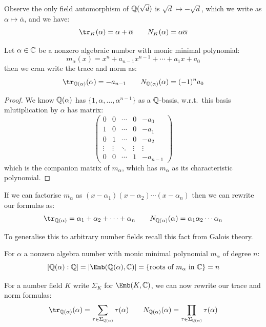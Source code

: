 \documentclass{article}
\begin{document}
Observe the only field automorphism of $\mathbb{Q}(\sqrt{d})$ is $\sqrt{d}\mapsto-\sqrt{d}$, which we write as $\alpha\mapsto\overline{\alpha}$, and we have: \[
    \tr_K(\alpha) = \alpha+\overline{\alpha} \qquad N_K(\alpha) = \alpha\overline{\alpha}
\]

\begin{proposition}
    Let $\alpha\in \mathbb{C}$ be a nonzero algebraic number with monic minimal polynomial: \[
    m_\alpha(x) = x^n + a_{n-1}x^{n-1} + \cdots + a_1x +a_0
    \] then we cran write the trace and norm as: \[
    \tr_{\bQ(\alpha)}(\alpha) = -a_{n-1} \qquad N_{\bQ(\alpha)}(\alpha) = (-1)^na_0
    \]\begin{proof}
        We know $\mathbb{Q}(\alpha)$ has $\{1,\alpha,\ldots,\alpha^{n-1}\}$ as a $\mathbb{Q}$-basis, w.r.t.~this basis mlutiplication by $\alpha$ has matrix: \[
        \begin{pmatrix}
            0 & 0 & \cdots & 0 & -a_0 \\
            1 & 0 & \cdots & 0 & -a_1 \\
            0 & 1 & \cdots & 0 & -a_2 \\
            \vdots & \vdots & \ddots & \vdots & \vdots \\
            0 & 0 & \cdots & 1 & -a_{n-1}
        \end{pmatrix}
        \] which is the companion matrix of $m_\alpha$, which has $m_\alpha$ as its characteristic polynomial.
    \end{proof}
\end{proposition}

If we can factorise $m_\alpha$ as $(x-\alpha_1)(x-\alpha_2)\cdots(x-\alpha_n)$ then we can rewrite our formulas as: \[
\tr_{\bQ(\alpha)} = \alpha_1 + \alpha_2 + \cdots + \alpha_n \qquad N_{\bQ(\alpha)}(\alpha) = \alpha_1\alpha_2\cdots\alpha_n
\]

To generalise this to arbitrary number fields recall this fact from Galois theory.

\begin{lemma}
    For $\alpha$ a nonzero algebra number with monic minimal polynomial $m_\alpha$ of degree $n$: \[
        [\bQ(\alpha):\bQ] = \abs{\Emb(\bQ(\alpha),\bC)} = \{\text{roots of $m_\alpha$ in $\bC$}\} = n
    \]
\end{lemma}

For a number field $K$ write $\Sigma_K$ for $\Emb(K,\bC)$, we can now rewrite our trace and norm formulas: \[
\tr_{\bQ(\alpha)}(\alpha) = \sum_{\tau\in\Sigma_{\bQ(\alpha)}}\tau(\alpha) \qquad N_{\bQ(\alpha)}(\alpha) = \prod_{\tau\in\Sigma_{\bQ(\alpha)}}\tau(\alpha)
\]
\end{document}
